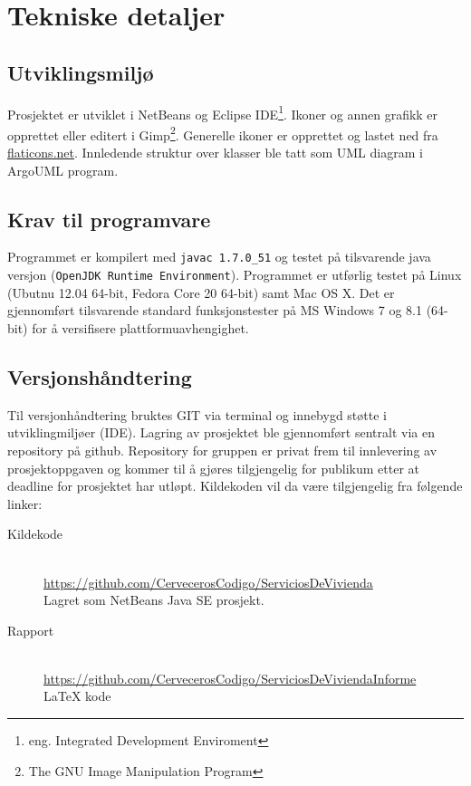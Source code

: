 \section{Tekniske detaljer}

\subsection{Utviklingsmiljø}
Prosjektet er utviklet i NetBeans og Eclipse IDE\footnote{eng. Integrated Development Enviroment}. Ikoner og annen grafikk er opprettet eller editert i Gimp\footnote{The GNU Image Manipulation Program}. Generelle ikoner er opprettet og lastet ned fra \href{http://www.flaticons.net}{flaticons.net}. Innledende struktur over klasser ble tatt som UML diagram i ArgoUML program.

\subsection{Krav til programvare}
Programmet er kompilert med \texttt{javac 1.7.0\_51} og testet på tilsvarende java versjon (\texttt{OpenJDK Runtime Environment}). Programmet er utførlig testet på Linux (Ubutnu 12.04 64-bit, Fedora Core 20 64-bit) samt Mac OS X. Det er gjennomført tilsvarende standard funksjonstester på MS Windows 7 og 8.1 (64-bit) for å versifisere plattformuavhengighet. 

\subsection{Versjonshåndtering}
Til versjonhåndtering bruktes GIT via terminal og innebygd støtte i utviklingmiljøer (IDE). Lagring av prosjektet ble gjennomført sentralt via en repository på github. Repository for gruppen er privat frem til innlevering av prosjektoppgaven og kommer til å gjøres tilgjengelig for publikum etter at deadline for prosjektet har utløpt. Kildekoden vil da være tilgjengelig fra følgende linker:

\begin{description}
\item[Kildekode]
\hfill \\
\url{https://github.com/CervecerosCodigo/ServiciosDeVivienda}
\\Lagret som NetBeans Java SE prosjekt.

\item[Rapport]
\hfill \\
\url{https://github.com/CervecerosCodigo/ServiciosDeViviendaInforme}
\\ \LaTeX{} kode
\end{description}